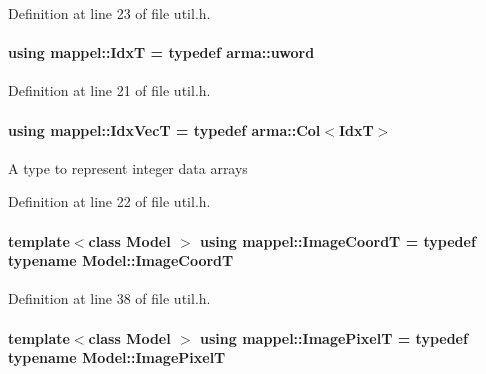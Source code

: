 Definition at line 23 of file util.\+h.

\paragraph[{\texorpdfstring{IdxT}{IdxT}}]{\setlength{\rightskip}{0pt plus 5cm}using {\bf mappel\+::\+IdxT} = typedef arma\+::uword}\hypertarget{namespacemappel_ab17ec0f30b61ece292439d7ece81d3a8}{}\label{namespacemappel_ab17ec0f30b61ece292439d7ece81d3a8}


Definition at line 21 of file util.\+h.

\paragraph[{\texorpdfstring{Idx\+VecT}{IdxVecT}}]{\setlength{\rightskip}{0pt plus 5cm}using {\bf mappel\+::\+Idx\+VecT} = typedef arma\+::\+Col$<${\bf IdxT}$>$}\hypertarget{namespacemappel_ac63743dcd42180127307cd0e4ecdd784}{}\label{namespacemappel_ac63743dcd42180127307cd0e4ecdd784}
A type to represent integer data arrays 

Definition at line 22 of file util.\+h.

\paragraph[{\texorpdfstring{Image\+CoordT}{ImageCoordT}}]{\setlength{\rightskip}{0pt plus 5cm}template$<$class Model $>$ using {\bf mappel\+::\+Image\+CoordT} = typedef typename Model\+::\+Image\+CoordT}\hypertarget{namespacemappel_a3ca6340183a2876d6bb6da936f1b667d}{}\label{namespacemappel_a3ca6340183a2876d6bb6da936f1b667d}


Definition at line 38 of file util.\+h.

\paragraph[{\texorpdfstring{Image\+PixelT}{ImagePixelT}}]{\setlength{\rightskip}{0pt plus 5cm}template$<$class Model $>$ using {\bf mappel\+::\+Image\+PixelT} = typedef typename Model\+::\+Image\+PixelT}\hypertarget{namespacemappel_a0b957a712590555ab00a1d0617a7f66f}{}\label{namespacemappel_a0b957a712590555ab00a1d0617a7f66f}


